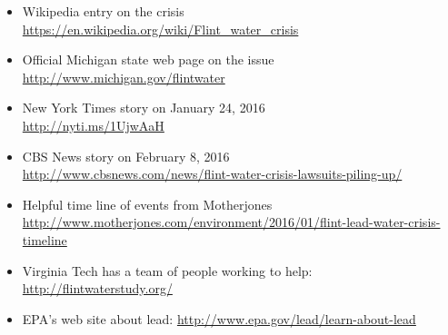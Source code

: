 \documentclass[12pt,letterpaper]{hmcpset}
\begin{document}
\begin{problem}[4]
\begin{itemize}
\item Wikipedia entry on the crisis \\ \url{https://en.wikipedia.org/wiki/Flint_water_crisis}
\item Official Michigan state web page on the issue \\
\url{http://www.michigan.gov/flintwater}
\item New York Times story on January 24, 2016\\ \url{http://nyti.ms/1UjwAaH}
\item CBS News story on February 8, 2016\\ \url{http://www.cbsnews.com/news/flint-water-crisis-lawsuits-piling-up/}
\item Helpful time line of events from Motherjones \\
\url{http://www.motherjones.com/environment/2016/01/flint-lead-water-crisis-timeline}
\item Virginia Tech has a team of people working to help: \url{http://flintwaterstudy.org/}
\item EPA's web site about lead: \url{http://www.epa.gov/lead/learn-about-lead}
\end{itemize}

\end{problem}
\end{document}

